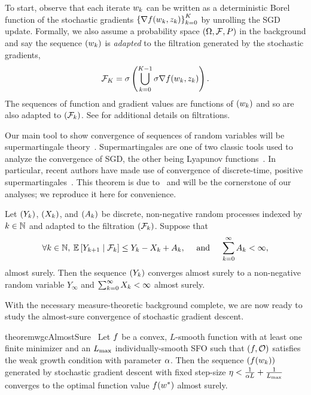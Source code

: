 To start, observe that each iterate \( \w_k \) can be written as a deterministic Borel function of the stochastic gradients \( \cbr{\grad(\wk, \zk)}_{\iter=0}^{K} \) by unrolling the \ac{SGD} update.
Formally, we also assume a probability space \( \rbr{\Omega,  \calF, P} \) in the background and say the sequence \( \seq{\wk} \) is \emph{adapted} to the filtration generated by the stochastic gradients,
\begin{align*}
    \calF_K = \sigma \rbr{\bigcup_{\iter = 0}^{K-1} \sigma \grad(\wk, \zk)}.
\end{align*}
The sequences of function and gradient values are functions of \( \seq{\wk} \) and so are also adapted to \( \seq{\calF_\iter} \).
See \citet{ccinlar2011probability} for additional details on filtrations.

Our main tool to show convergence of sequences of random variables will be supermartingale theory~\citep{ccinlar2011probability}.
Supermartingales are one of two classic tools used to analyze the convergence of \ac{SGD}, the other being Lyapunov functions~\citep{bertsekas2000gradient}.
In particular, recent authors have made use of convergence of discrete-time, positive supermartingales~\citep{bertsekas2011incremental, nguyen2018sgd}.
This theorem is due to~\citet{neveu1975discrete} and will be the cornerstone of our analyses; we reproduce it here for convenience.

\begin{theorem}\label{thm:positive_supermartingales}
    Let \( \seq{Y_\iter} \), \( \seq{X_\iter} \), and \( \seq{A_\iter} \) be discrete, non-negative random processes indexed by \( \iter \in \bbN \) and adapted to the filtration \( \seq{\calF_\iter} \).
    Suppose that
    \begin{align*}
        \forall \iter \in \bbN, \: \E \sbr{Y_{\iter+1} \mid \calF_\iter} \leq Y_\iter - X_\iter + A_\iter,
        \quad \text{ and } \quad 
        \sum_{k=0}^{\infty} A_\iter < \infty,
    \end{align*}
    almost surely.
    Then the sequence \( \seq{Y_\iter} \) converges almost surely to a non-negative random variable \( Y_\infty \) and \( \sum_{k=0}^{\infty} X_\iter < \infty \) almost surely.
\end{theorem}
\noindent With the necessary measure-theoretic background complete, we are now ready to study the almost-sure convergence of stochastic gradient descent.

\begin{restatable}{theorem}{wgcAlmostSure}~\label{thm:wgc-almost-sure}
    Let \( \f \) be a convex, \( L \)-smooth function with at least one finite minimizer and \oracle{} an \( \Lmax \) individually-smooth \ac{SFO} such that \( \rbr{f, \oracle{}} \) satisfies the weak growth condition with parameter \( \wgc \).
Then the sequence \( \seq{f(\wk)} \) generated by stochastic gradient descent with fixed step-size \( \eta < \frac{1}{\wgc L} + \frac{1}{\Lmax} \) converges to the optimal function value \( f(\wopt) \) almost surely.
\end{restatable}

